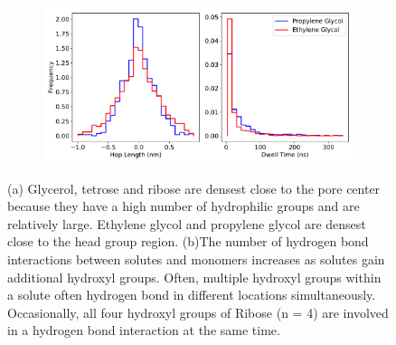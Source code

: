 \documentclass{article}
\begin{document}
\begin{figure}[!htb]
\begin{subfigure}{\textwidth}
  \includegraphics[width=0.9\linewidth]{dwell_hop_PG_GCL.pdf}
  \caption{}\label{fig:dwell_hop_PG_GCL}
  \end{subfigure}
  \caption{(a) Glycerol, tetrose and ribose are densest close to the pore center because
  they have a high number of hydrophilic groups and are relatively large. Ethylene glycol
  and propylene glycol are densest close to the head group region. (b)The number of 
  hydrogen bond interactions between solutes and monomers increases as solutes gain additional
  hydroxyl groups. Often, multiple hydroxyl groups within a solute often hydrogen bond in
  different locations simultaneously. Occasionally, all four hydroxyl groups
  of Ribose (n = 4) are involved in a hydrogen bond interaction at the same time.}\label{fig:multi_hbonds}
  \end{figure}
  
\end{document}
